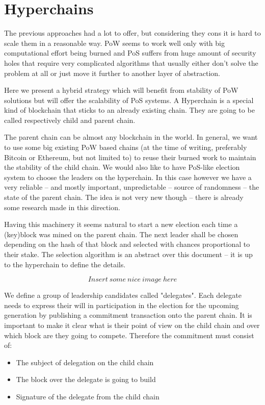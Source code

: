 \section{Hyperchains}

The previous approaches had a lot to offer, but considering they cons it is hard
to scale them in a reasonable way. PoW seems to work well only with big
computational effort being burned and PoS suffers from huge amount of security
holes that require very complicated algorithms that usually either don't solve
the problem at all or just move it further to another layer of abstraction.

Here we present a hybrid strategy which will benefit from stability of PoW
solutions but will offer the scalability of PoS systems. A Hyperchain is a
special kind of blockchain that sticks to an already existing chain. They are
going to be called respectively child and parent chain\cite{hyperchains}.

The parent chain can be almost any blockchain in the world. In general, we want
to use some big existing PoW based chains (at the time of writing, preferably
Bitcoin or Ethereum, but not limited to) to reuse their burned work to maintain
the stability of the child chain. We would also like to have
PoS-like election system to choose the leaders on the hyperchain. In this case
however we have a very reliable – and mostly important, unpredictable – source
of randomness – the state of the parent chain. The idea is not very new
though – there is already some research made in this direction\cite{blockchain_random}.

Having this machinery it seems natural to start a new election each time a
(key)block was mined on the parent chain. The next leader shall be chosen
depending on the hash of that block and selected with chances proportional to
their stake. The selection algorithm is an abstract over this document – it is
up to the hyperchain to define the details.

$$Insert\ some\ nice\ image\ here$$

We define a group of leadership candidates called "delegates". Each delegate
needs to express their will in participation in the election for the upcoming
generation by publishing a commitment transaction onto the parent chain. It is
important to make it clear what is their point of view on the child chain and
over which block are they going to compete.
Therefore the commitment must consist of:
\begin{itemize}
\item The subject of delegation on the child chain
\item The block over the delegate is going to build
\item Signature of the delegate from the child chain
\end{itemize}

